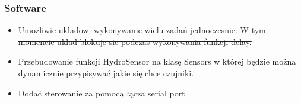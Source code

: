 \documentclass[a4paper,11pt]{uzreport}
\begin{document}
\subsubsection{Software}
\begin{itemize}
    \item \st{Umozliwic ukladowi wykonywanie wielu zadań jednoczesnie. W tym momencie uklad blokuje sie podczas wykonywania funkcji delay.}        \label{fig:update}

    \item Przebudowanie funkcji HydroSensor na klasę Sensors w której będzie można dynamicznie przypisywać jakie się chce czujniki.
    \item Dodać sterowanie za pomocą łącza serial port

\end{itemize}
\end{document}
